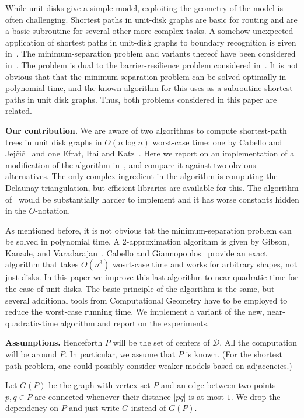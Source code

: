 \documentclass[a4paper,USenglish,numberwithinsect]{lipics}
\newcommand{\D}{\ensuremath{\mathcal{D}}}
\def\myparagraph#1{\medskip\noindent\textbf{#1.}}
\begin{document}
While unit disks give a simple model, exploiting the geometry of the model
is often challenging. 
Shortest paths in unit-disk graphs are basic for routing and
are a basic subroutine for several other more complex tasks. 
A somehow unexpected application of shortest paths in unit-disk graphs
to boundary recognition is given in~\cite{WGM06}.
The minimum-separation problem and variants thereof have been considered 
in~\cite{CG16,gkv-ipud-11,pv-2013}. 
The problem is dual to the barrier-resilience problem considered in~\cite{BK09,KH07,KLA05,KLA07}.
It is not obvious that that the minimum-separation problem can be solved optimally
in polynomial time, and the known algorithm for this uses as a subroutine 
shortest paths in unit disk graphs. Thus, both problems considered in this paper are related.


\myparagraph{Our contribution}
We are aware of two algorithms to compute shortest-path trees in unit disk graphs in
$O(n\log n)$ worst-case time: one by Cabello and Jej\v{c}i\v{c}~\cite{CJ15} and one Efrat, Itai and Katz~\cite{eik-01}. 
Here we report on an implementation of a modification of the algorithm in~\cite{CJ15},
and compare it against two obvious alternatives.
The only complex ingredient in the algorithm is computing the Delaunay triangulation,
but efficient libraries are available for this.
The algorithm of~\cite{eik-01} would be substantially harder to implement 
and it has worse constants hidden in the $O$-notation. 

As mentioned before, it is not obvious tat the minimum-separation problem can be solved
in polynomial time. 
A 2-approximation algorithm is given by Gibson, Kanade, and Varadarajan~\cite{gkv-ipud-11}. 
Cabello and Giannopoulos~\cite{CG16} provide an exact algorithm that takes $O(n^3)$ 
wosrt-case time and works for arbitrary shapes, not just disks. 
In this paper we improve this last algorithm to near-quadratic time for the case
of unit disks. 
The basic principle of the algorithm is the same, but several additional tools
from Computational Geometry have to be employed to reduce the worst-case running time. 
We implement a variant of the new, near-quadratic-time algorithm and report
on the experiments.


\myparagraph{Assumptions} 
Henceforth $P$ will be the set of centers of $\D$. 
All the computation will be around $P$. In particular, we assume that $P$ is known.
(For the shortest path problem, one could possibly consider weaker models based 
on adjacencies.)

Let $G(P)$ be the graph with vertex set $P$ and an edge between two points $p,q\in P$ 
are connected whenever their distance $|pq|$ is at most $1$. We drop the dependency on $P$
and just write $G$ instead of $G(P)$. 
\end{document}
